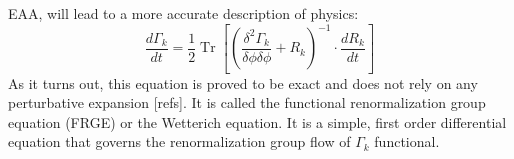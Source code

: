 \documentclass[11pt, a4paper]{article}
\begin{document}
 EAA, will lead to a more accurate description of physics:
\begin{equation}
    \frac{d \Gamma_k}{dt} = \frac{1}{2} \operatorname{Tr} \left[ \left(\frac{\delta^2 \Gamma_k}{\delta \phi \delta \phi} + R_k\right)^{-1} \cdot \frac{d R_k}{dt} \right]
    \label{FRGE}
\end{equation}
As it turns out, this equation is proved to be exact and does not rely on any perturbative expansion [refs].
It is called the functional renormalization group equation (FRGE) or the Wetterich equation.
It is a simple, first order differential equation that governs the renormalization group flow of $\Gamma_k$ functional.

\end{document}
